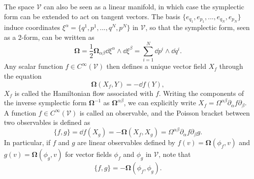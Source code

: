 \documentclass[letterpaper,12pt,titlepage,oneside,final]{book}
\let\origdoublepage\cleardoublepage
\newcommand{\clearemptydoublepage}{%
  \clearpage{\pagestyle{empty}\origdoublepage}}
\let\cleardoublepage\clearemptydoublepage
\begin{document}
The space $\mathcal{V}$ can also be seen as a linear manifold, in which case the symplectic form can be extended to act on tangent vectors. The basis $\{ e_{q_1},  e_{p_1},..., e_{q_N}, e_{p_N}\}$ induce coordinates $\xi^\alpha = \{q^1,p^1,...,q^N,p^N\}$ in $\mathcal{V}$, so that the symplectic form, seen as a 2-form, can be written as
\begin{equation}
    \bm \Omega = \frac{1}{2} \bm \Omega_{\alpha\beta} \dd\xi^\alpha\wedge \dd \xi^\beta = \sum_{i=1}^N \dd p^i \wedge \dd q^i.
\end{equation}
Any scalar function $f\in C^\infty(\mathcal{V})$ then defines a unique vector field $X_f$ through the equation 
\begin{equation}\label{eq:flowXf}
    \bm \Omega(X_f,Y) = - \dd f(Y),
\end{equation}
$X_f$ is called the Hamiltonian flow associated with $f$. Writing the components of the inverse symplectic form $\bm \Omega^{-1}$ as $\bm \Omega^{\alpha\beta}$, we can explicitly write $X_f = \Omega^{\alpha\beta}\partial_\alpha f\partial_\beta$. A function $f\in C^\infty(\mathcal{V})$ is called an observable, and the Poisson bracket between two observables is defined as
\begin{equation}\label{eq:poisson0}
    \{f,g\} = \dd f(X_g) = -\bm \Omega(X_f,X_g) = \Omega^{\alpha\beta}\partial_\alpha f \partial_\beta g.
\end{equation}
In particular, if $f$ and $g$ are linear observables defined by $f(v) = \bm \Omega(\phi_f,v)$ and $g(v) = \bm \Omega(\phi_g,v)$ for vector fields $\phi_f$ and $\phi_g$ in $\mathcal{V}$, note that
\begin{equation}\label{eq:pain}
        \{f,g\} = - \bm \Omega(\phi_f,\phi_g). %
\end{equation}



\cleardoublepage
{}		%


\printglossary[type=symbols]
\cleardoublepage
{}		%
\end{document}
